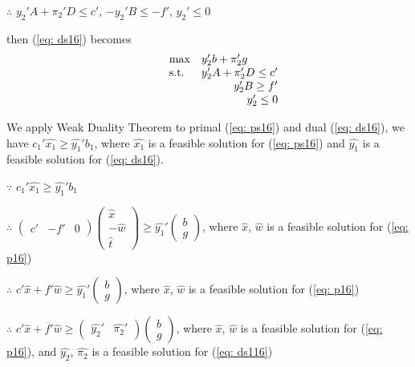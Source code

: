$\therefore$ $y_{2}'A+\pi _{2}'D \leq c'$, $-y_{2}'B \leq -f'$, $y_{2}' \leq 0$

then (\ref{eq: ds16}) becomes
\begin{equation}
\label{eq: ds116}
  \begin{array}{lrcll}
    \max
    & \multicolumn{4}{l}{y_{2}'b+\pi _{2}'g} \\
    \text{s.t.}
    & y_{2}'A+\pi _{2}'D \leq c'\\
    & y_{2}'B \geq f'\\
    & y_{2}' \leq 0
  \end{array}
\end{equation}

We apply Weak Duality Theorem to primal (\ref{eq: ps16}) and dual (\ref{eq: ds16}), we have $c_{1}'\widehat{x_{1}} \geq \widehat{y_{1}}'b_{1}$, where $\widehat{x_{1}}$ is a feasible solution for (\ref{eq: ps16}) and $\widehat{y_{1}}$ is a feasible solution for (\ref{eq: ds16}).

$\because$  $c_{1}'\widehat{x_{1}} \geq \widehat{y_{1}}'b_{1}$

$\therefore$ $\left( \begin{array}{ccc} c' & -f' & 0 \end{array}\right)  \left( \begin{array}{c} \widehat{x} \\ -\widehat{w} \\ \widehat{t} \end{array}\right)  \geq \widehat{y_{1}}'\left( \begin{array}{c} b \\ g \end{array}\right)$, where $\widehat{x}$, $\widehat{w}$ is a feasible solution for (\ref{eq: p16})

$\therefore$ $c'\widehat{x}+f'\widehat{w}  \geq \widehat{y_{1}}'\left( \begin{array}{c} b \\ g \end{array}\right)$, where $\widehat{x}$, $\widehat{w}$ is a feasible solution for (\ref{eq: p16})

$\therefore$ $c'\widehat{x}+f'\widehat{w}  \geq \left( \begin{array}{cc} \widehat{y_{2}}' &  \widehat{\pi _{2}}' \end{array}\right) \left( \begin{array}{c} b \\ g \end{array}\right)$, where $\widehat{x}$, $\widehat{w}$ is a feasible solution for (\ref{eq: p16}), and $\widehat{y_{2}}$, $\widehat{\pi _{2}}$ is a feasible solution for (\ref{eq: ds116})

